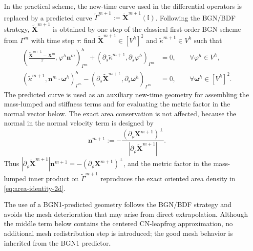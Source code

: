 \documentclass[smallextended]{svjour3}
\numberwithin{equation}{section}
\begin{document}
	In the practical scheme, the new-time curve used in the differential operators is replaced by a predicted curve $\widetilde{\Gamma}^{m+1}:=\widetilde{\mathbf{X}}^{m+1}(\mathbb{I})$. Following the BGN/BDF strategy, $\widetilde{\mathbf{X}}^{m+1}$ is obtained by one step of the classical first-order BGN scheme from $\Gamma^m$ with time step $\tau$: find $\widetilde{\mathbf{X}}^{m+1}\in[V^h]^2$ and $\widetilde{\kappa}^{m+1}\in V^h$ such that
	\begin{subequations}
		\label{eq:BGN1-predictor-2d}
		\begin{align}
			\left(
			\frac{\widetilde{\mathbf{X}}^{m+1}-\mathbf{X}^{m}}{\tau},
			\varphi^h\mathbf{n}^{m}
			\right)^h_{\Gamma^{m}}
			+
			\left(
			\partial_s\widetilde{\kappa}^{m+1},
			\partial_s\varphi^h
			\right)_{\Gamma^{m}}
			&=0,
			\qquad \forall \varphi^h\in V^h,
			\\
			\left(
			\widetilde{\kappa}^{m+1},
			\mathbf{n}^{m}\cdot\boldsymbol{\omega}^h
			\right)^h_{\Gamma^{m}}
			-
			\left(
			\partial_s\widetilde{\mathbf{X}}^{m+1},
			\partial_s\boldsymbol{\omega}^h
			\right)_{\Gamma^{m}}
			&=0,
			\qquad \forall \boldsymbol{\omega}^h\in[V^h]^2.
		\end{align}
	\end{subequations}
The predicted curve is used as an auxiliary new-time geometry for assembling the mass-lumped and stiffness terms and for evaluating the metric factor in the normal vector below. The exact area conservation is not affected, because the normal in the normal velocity term is designed by
	\begin{equation}
		\mathbf{n}^{m+1}
		:=
		-\frac{(\partial_\rho\mathbf{X}^{m+1})^\perp}
		{|\partial_\rho\widetilde{\mathbf{X}}^{m+1}|}.
		\label{eq:sp-normal-2d}
	\end{equation}
	Thus $|\partial_\rho\widetilde{\mathbf{X}}^{m+1}|\mathbf{n}^{m+1}=-(\partial_\rho\mathbf{X}^{m+1})^\perp$, and the metric factor in the mass-lumped inner product on $\widetilde{\Gamma}^{m+1}$ reproduces the exact oriented area density in \eqref{eq:area-identity-2d}.
	
	\begin{remark}
		The use of a BGN1-predicted geometry follows the BGN/BDF strategy and avoids the mesh deterioration that may arise from direct extrapolation. Although the middle term below contains the centered CN-leapfrog approximation, no additional mesh redistribution step is introduced; the good mesh behavior is inherited from the BGN1 predictor.
	\end{remark}
	
\end{document}
